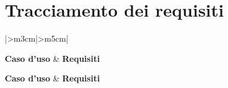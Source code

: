 \documentclass[a4paper,10pt]{article}
\def\\{ }%
\def\\{ }%
\def\\{ }%
\begin{document}
    \section{Tracciamento dei requisiti}
        \begin{longtable}{|>{\centering\arraybackslash}m{3cm}|>{\centering\arraybackslash}m{5cm}|}
            \caption{}\label{tab:tracciamento} \\

            \hline
            \textbf{Caso d'uso} & \textbf{Requisiti} \\
            \hline
            \endfirsthead

            \hline
            \textbf{Caso d'uso} & \textbf{Requisiti} \\
            \hline
            \endhead

            \hline
            \endfoot

            \hline
            \endlastfoot


\end{longtable}
\end{document}
